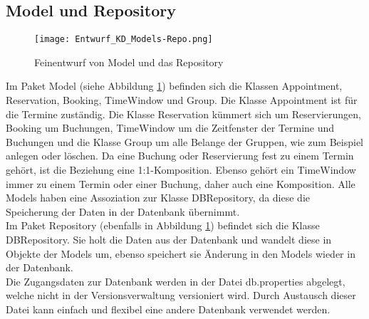  \subsection{Model und Repository}
 \begin{figure}
  \texttt{[image: Entwurf\_KD\_Models-Repo.png]}
  \label{fig:Klassendiagramm_Models-Repo}
\caption{Feinentwurf von Model und das Repository}
 \end{figure}

Im Paket Model (siehe Abbildung \ref{fig:Klassendiagramm_Models-Repo}) befinden sich die Klassen Appointment, Reservation, Booking, TimeWindow und Group. Die Klasse Appointment ist für die Termine zuständig. Die Klasse Reservation kümmert sich um Reservierungen, Booking um Buchungen, TimeWindow um die Zeitfenster der Termine und Buchungen und die Klasse Group um alle Belange der Gruppen, wie zum Beispiel anlegen oder löschen.
Da eine Buchung oder Reservierung fest zu einem Termin gehört, ist die Beziehung eine 1:1-Komposition. Ebenso gehört ein TimeWindow immer zu einem Termin oder einer Buchung, daher auch eine Komposition.
Alle Models haben eine Assoziation zur Klasse DBRepository, da diese die Speicherung der Daten in der Datenbank übernimmt.
\\

Im Paket Repository (ebenfalls in Abbildung \ref{fig:Klassendiagramm_Models-Repo}) befindet sich die Klasse DBRepository. Sie holt die Daten aus der Datenbank und wandelt diese in Objekte der Models um, ebenso speichert sie Änderung in den Models wieder in der Datenbank. \\
Die Zugangsdaten zur Datenbank werden in der Datei db.properties abgelegt, welche nicht in der Versionsverwaltung versioniert wird. Durch Austausch dieser Datei kann einfach und flexibel eine andere Datenbank verwendet werden.
